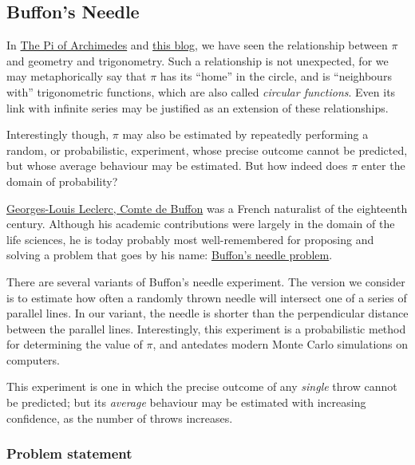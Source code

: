\documentclass[
  a4paper,
]{article}
\begin{document}
\subsection{Buffon's Needle}\label{buffons-needle}

In \href{https://swanlotus.netlify.app/blogs/the-pi-of-archimedes}{The
Pi of Archimedes} and
\href{https://swanlotus.netlify.app/blogs/the-wonder-that-is-pi}{this
blog}, we have seen the relationship between \(\pi\) and geometry and
trigonometry. Such a relationship is not unexpected, for we may
metaphorically say that \(\pi\) has its ``home'' in the circle, and is
``neighbours with'' trigonometric functions, which are also called
\emph{circular functions}. Even its link with infinite series may be
justified as an extension of these relationships.

Interestingly though, \(\pi\) may also be estimated by repeatedly
performing a random, or probabilistic, experiment, whose precise outcome
cannot be predicted, but whose average behaviour may be estimated. But
how indeed does \(\pi\) enter the domain of probability?

\href{https://en.wikipedia.org/wiki/Georges-Louis_Leclerc,_Comte_de_Buffon}{Georges-Louis
Leclerc, Comte de Buffon} was a French naturalist of the eighteenth
century. Although his academic contributions were largely in the domain
of the life sciences, he is today probably most well-remembered for
proposing and solving a problem that goes by his name:
\href{https://en.wikipedia.org/wiki/Buffon\%27s_needle_problem}{Buffon's
needle problem}.

There are several variants of Buffon's needle experiment. The version we
consider is to estimate how often a randomly thrown needle will
intersect one of a series of parallel lines. In our variant, the needle
is shorter than the perpendicular distance between the parallel lines.
Interestingly, this experiment is a probabilistic method for determining
the value of \(\pi\), and antedates modern Monte Carlo simulations on
computers.

This experiment is one in which the precise outcome of any \emph{single}
throw cannot be predicted; but its \emph{average} behaviour may be
estimated with increasing confidence, as the number of throws increases.

\subsubsection{Problem statement}\label{problem-statement}
\end{document}
